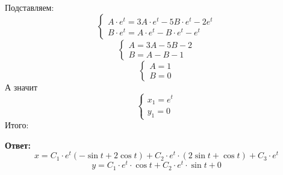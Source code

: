 \documentclass[a4paper,12pt]{article}
\begin{document}
Подставляем:
\[
\begin{cases}
A \cdot e^{t}= 3A \cdot e^{t}-5B \cdot e^t -2e^t \\
B \cdot e^t= A \cdot e^{t} - B \cdot e^t - e^t
\end{cases}
\]
\[
\begin{cases}
A = 3A -5B  -2\\
B = A - B  - 1
\end{cases}
\]
\[
\begin{cases}
A = 1 \\
B = 0
\end{cases}
\]
А значит
\[
\begin{cases}
x_1 = e^t \\
y_1 = 0 
\end{cases}
\]
Итого:
\begin{center}
\textbf{Ответ: } 
\[
x = C_1 \cdot e^t(- \sin t + 2 \cos t) + C_2 \cdot e^t \cdot (2 \sin t + \cos t)+ C_3 \cdot e^t
\]
\[
y =  C_1 \cdot e^t \cdot \cos t + C_2 \cdot e^t \cdot \sin t + 0
\]
\end{center}
\clearpage
\end{document}
